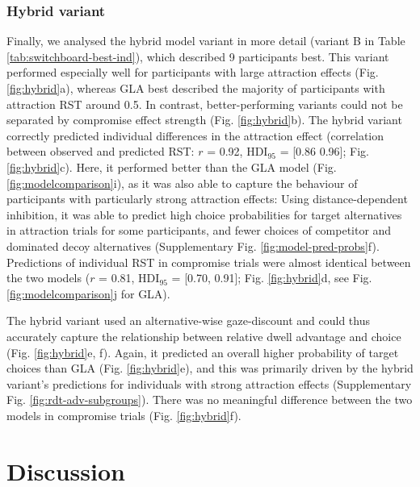 \documentclass[11pt, a4paper]{article}
\begin{document}
\subsubsection*{Hybrid variant}

Finally, we analysed the hybrid model variant in more detail (variant B in Table \ref{tab:switchboard-best-ind}), which described 9 participants best. This variant performed especially well for participants with large attraction effects (Fig. \ref{fig:hybrid}a), whereas GLA best described the majority of participants with attraction RST around 0.5. In contrast, better-performing variants could not be separated by compromise effect strength (Fig. \ref{fig:hybrid}b). The hybrid variant correctly predicted individual differences in the attraction effect (correlation between observed and predicted RST: $r$ = 0.92, HDI$_{95}$ = [0.86 0.96]; Fig. \ref{fig:hybrid}c). Here, it performed better than the GLA model (Fig. \ref{fig:modelcomparison}i), as it was also able to capture the behaviour of participants with particularly strong attraction effects: Using distance-dependent inhibition, it was able to predict high choice probabilities for target alternatives in attraction trials for some participants, and fewer choices of competitor and dominated decoy alternatives (Supplementary Fig. \ref{fig:model-pred-probs}f). Predictions of individual RST in compromise trials were almost identical between the two models ($r$ = 0.81, HDI$_{95}$ = [0.70, 0.91]; Fig. \ref{fig:hybrid}d, see Fig. \ref{fig:modelcomparison}j for GLA). 

The hybrid variant used an alternative-wise gaze-discount and could thus accurately capture the relationship between relative dwell advantage and choice (Fig. \ref{fig:hybrid}e, f). Again, it predicted an overall higher probability of target choices than GLA (Fig. \ref{fig:hybrid}e), and this was primarily driven by the hybrid variant’s predictions for individuals with strong attraction effects (Supplementary Fig. \ref{fig:rdt-adv-subgroups}). There was no meaningful difference between the two models in compromise trials (Fig. \ref{fig:hybrid}f).

\section*{Discussion}
\end{document}
